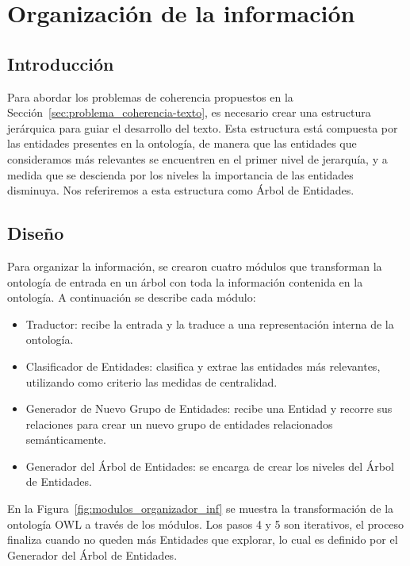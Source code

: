 \chapter{Organización de la información}

\section{Introducción}
Para abordar los problemas de coherencia propuestos en la Sección~\ref{sec:problema_coherencia-texto}, es necesario crear una estructura jerárquica para guiar el desarrollo del texto. Esta estructura está compuesta por las entidades presentes en la ontología, de manera que las entidades que consideramos más relevantes se encuentren en el primer nivel de jerarquía, y a medida que se descienda por los niveles la importancia de las entidades disminuya. Nos referiremos a esta estructura como Árbol de Entidades.

\section{Diseño}
Para organizar la información, se crearon cuatro módulos que transforman la ontología de entrada en un árbol con toda la información contenida en la ontología. A continuación se describe cada módulo:
\begin{itemize}
    \item Traductor: recibe la entrada y la traduce a una representación interna de la ontología.
    \item Clasificador de Entidades: clasifica y extrae las entidades más relevantes, utilizando como criterio las medidas de centralidad.
    \item Generador de Nuevo Grupo de Entidades: recibe una Entidad y recorre sus relaciones para crear un nuevo grupo de entidades relacionados semánticamente.
    \item Generador del Árbol de Entidades: se encarga de crear los niveles del Árbol de Entidades. 
\end{itemize}

En la Figura~\ref{fig:modulos_organizador_inf} se muestra la transformación de la ontología OWL a través de los módulos. Los pasos 4 y 5 son iterativos, el proceso finaliza cuando no queden más Entidades que explorar, lo cual es definido por el Generador del Árbol de Entidades.

